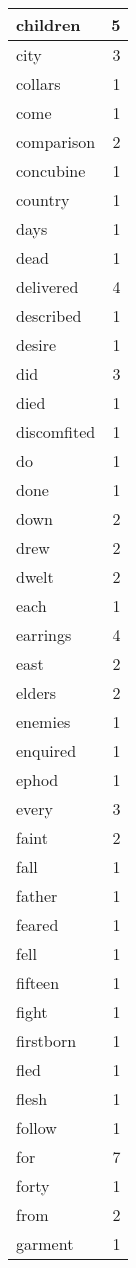 \begin{center}
\begin{longtable}{l|r}
children & 5\\ \hline 
city & 3\\ \hline 
collars & 1\\ \hline 
come & 1\\ \hline 
comparison & 2\\ \hline 
concubine & 1\\ \hline 
country & 1\\ \hline 
days & 1\\ \hline 
dead & 1\\ \hline 
delivered & 4\\ \hline 
described & 1\\ \hline 
desire & 1\\ \hline 
did & 3\\ \hline 
died & 1\\ \hline 
discomfited & 1\\ \hline 
do & 1\\ \hline 
done & 1\\ \hline 
down & 2\\ \hline 
drew & 2\\ \hline 
dwelt & 2\\ \hline 
each & 1\\ \hline 
earrings & 4\\ \hline 
east & 2\\ \hline 
elders & 2\\ \hline 
enemies & 1\\ \hline 
enquired & 1\\ \hline 
ephod & 1\\ \hline 
every & 3\\ \hline 
faint & 2\\ \hline 
fall & 1\\ \hline 
father & 1\\ \hline 
feared & 1\\ \hline 
fell & 1\\ \hline 
fifteen & 1\\ \hline 
fight & 1\\ \hline 
firstborn & 1\\ \hline 
fled & 1\\ \hline 
flesh & 1\\ \hline 
follow & 1\\ \hline 
for & 7\\ \hline 
forty & 1\\ \hline 
from & 2\\ \hline 
garment & 1\\ \hline 

\end{longtable}
\end{center}
